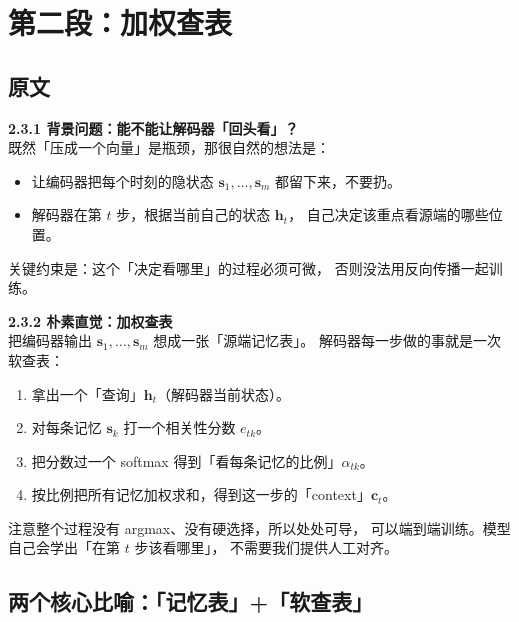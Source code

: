 \documentclass[11pt,a4paper]{ctexart}
\newcommand{\vect}[1]{\boldsymbol{#1}}
\begin{document}
\section{第二段：加权查表}

\subsection{原文}

\begin{quoteblock}
\textbf{2.3.1 背景问题：能不能让解码器「回头看」？}\\[2pt]
既然「压成一个向量」是瓶颈，那很自然的想法是：

\begin{itemize}
  \item 让编码器把每个时刻的隐状态 $\vect{s}_1, \dots, \vect{s}_m$ 都留下来，不要扔。
  \item 解码器在第 $t$ 步，根据当前自己的状态 $\vect{h}_t$，
        自己决定该重点看源端的哪些位置。
\end{itemize}

关键约束是：这个「决定看哪里」的过程必须可微，
否则没法用反向传播一起训练。

\textbf{2.3.2 朴素直觉：加权查表}\\[2pt]
把编码器输出 $\vect{s}_1, \dots, \vect{s}_m$ 想成一张「源端记忆表」。
解码器每一步做的事就是一次软查表：

\begin{enumerate}
  \item 拿出一个「查询」$\vect{h}_t$（解码器当前状态）。
  \item 对每条记忆 $\vect{s}_k$ 打一个相关性分数 $e_{tk}$。
  \item 把分数过一个 softmax 得到「看每条记忆的比例」$\alpha_{tk}$。
  \item 按比例把所有记忆加权求和，得到这一步的「context」$\vect{c}_t$。
\end{enumerate}

注意整个过程没有 argmax、没有硬选择，所以处处可导，
可以端到端训练。模型自己会学出「在第 $t$ 步该看哪里」，
不需要我们提供人工对齐。
\end{quoteblock}

\subsection{两个核心比喻：「记忆表」+「软查表」}
\end{document}

